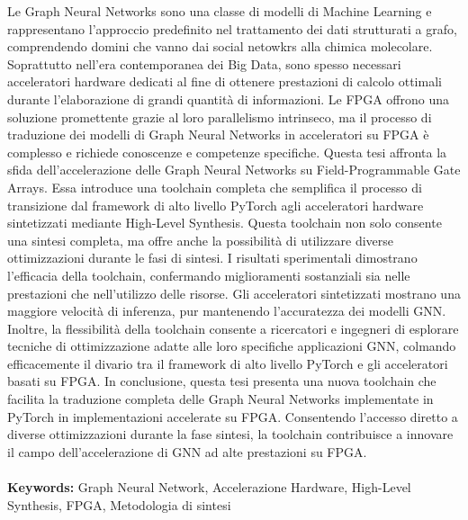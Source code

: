 Le Graph Neural Networks sono una classe di modelli di Machine Learning e rappresentano l'approccio predefinito nel trattamento dei dati strutturati a grafo, comprendendo domini che vanno dai social netowkrs alla chimica molecolare.
Soprattutto nell'era contemporanea dei Big Data, sono spesso necessari acceleratori hardware dedicati al fine di ottenere prestazioni di calcolo ottimali durante l'elaborazione di grandi quantità di informazioni.
Le FPGA offrono una soluzione promettente grazie al loro parallelismo intrinseco, ma il processo di traduzione dei modelli di Graph Neural Networks in acceleratori su FPGA è complesso e richiede conoscenze e competenze specifiche.
Questa tesi affronta la sfida dell'accelerazione delle Graph Neural Networks su Field-Programmable Gate Arrays.
Essa introduce una toolchain completa che semplifica il processo di transizione dal framework di alto livello PyTorch agli acceleratori hardware sintetizzati mediante High-Level Synthesis.
Questa toolchain non solo consente una sintesi completa, ma offre anche la possibilità di utilizzare diverse ottimizzazioni durante le fasi di sintesi.
I risultati sperimentali dimostrano l'efficacia della toolchain, confermando miglioramenti sostanziali sia nelle prestazioni che nell'utilizzo delle risorse.
Gli acceleratori sintetizzati mostrano una maggiore velocità di inferenza, pur mantenendo l'accuratezza dei modelli GNN\@.
Inoltre, la flessibilità della toolchain consente a ricercatori e ingegneri di esplorare tecniche di ottimizzazione adatte alle loro specifiche applicazioni GNN, colmando efficacemente il divario tra il framework di alto livello PyTorch e gli acceleratori basati su FPGA\@.
In conclusione, questa tesi presenta una nuova toolchain che facilita la traduzione completa delle Graph Neural Networks implementate in PyTorch in implementazioni accelerate su FPGA\@.
Consentendo l'accesso diretto a diverse ottimizzazioni durante la fase sintesi, la toolchain contribuisce a innovare il campo dell'accelerazione di GNN ad alte prestazioni su FPGA\@.
\\
\\
\textbf{Keywords:} Graph Neural Network, Accelerazione Hardware, High-Level Synthesis, FPGA, Metodologia di sintesi %